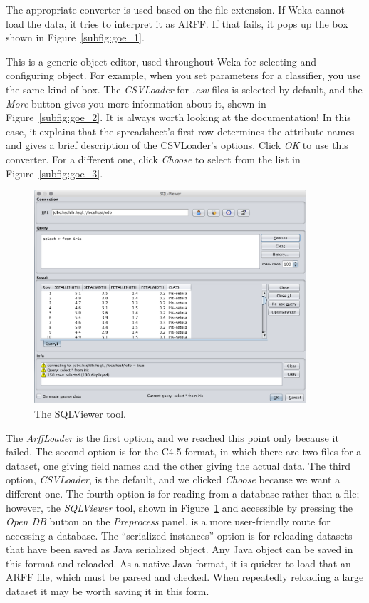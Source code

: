 The appropriate converter is used based on the file extension. If Weka
cannot load the data, it tries to interpret it as ARFF. If that fails,
it pops up the box shown in Figure~\ref{subfig:goe_1}.

This is a generic object editor, used throughout Weka for selecting
and configuring object. For example, when you set parameters for a
classifier, you use the same kind of box. The \textit{CSVLoader} for
\textit{.csv} files is selected by default, and the \textit{More}
button gives you more information about it, shown in
Figure~\ref{subfig:goe_2}. It is always worth looking at the
documentation! In this case, it explains that the spreadsheet's first
row determines the attribute names and gives a brief description of
the CSVLoader's options. Click \textit{OK} to use this converter. For
a different one, click \textit{Choose} to select from the list in
Figure~\ref{subfig:goe_3}.

\begin{figure}[!th]
\centering
\includegraphics[width=0.9\textwidth]{images/B2_8.png}
\caption{The SQLViewer tool.}
\label{fig:sql_viewer}
\end{figure}


The \textit{ArffLoader} is the first option, and we reached this point
only because it failed. The second option is for the C4.5 format, in
which there are two files for a dataset, one giving field names and
the other giving the actual data. The third option,
\textit{CSVLoader}, is the default, and we clicked \textit{Choose}
because we want a different one. The fourth option is for reading from
a database rather than a file; however, the \textit{SQLViewer} tool,
shown in Figure~\ref{fig:sql_viewer} and accessible by pressing the \textit{Open DB}
button on the \textit{Preprocess} panel, is a more user-friendly route
for accessing a database. The ``serialized instances'' option is for
reloading datasets that have been saved as Java serialized object. Any
Java object can be saved in this format and reloaded. As a native Java
format, it is quicker to load that an ARFF file, which must be parsed
and checked. When repeatedly reloading a large dataset it may be worth
saving it in this form.

